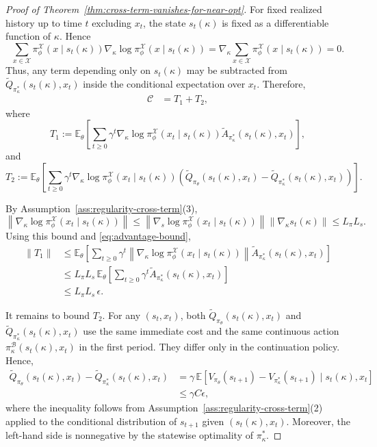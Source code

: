 \documentclass{article}
\theoremstyle{definition}
\theoremstyle{remark}
\begin{document}
\begin{proof}[Proof of Theorem~\ref{thm:cross-term-vanishes-for-near-opt}]
For fixed realized history up to time $t$ excluding $x_t$, the state
$s_t(\kappa)$ is fixed as a differentiable function of $\kappa$. Hence
\[
\sum_{x\in\mathcal X}
\pi^{\mathcal X}_\phi(x\mid s_t(\kappa))
\nabla_\kappa \log \pi^{\mathcal X}_\phi(x\mid s_t(\kappa))
=
\nabla_\kappa
\sum_{x\in\mathcal X}
\pi^{\mathcal X}_\phi(x\mid s_t(\kappa))
=0.
\]
Thus, any term depending only on $s_t(\kappa)$ may be subtracted from
$\tilde Q_{\pi^*_\kappa}(s_t(\kappa),x_t)$ inside the conditional expectation over $x_t$.
Therefore,
\begin{align*}
\mathcal C
&=
T_1+T_2,
\end{align*}
where
\[
T_1
:=
\mathbb{E}_{\theta}\!\left[
\sum_{t\geq 0}\gamma^t
\nabla_{\kappa}\log \pi^{\mathcal X}_{\phi}
\!\left(x_t\mid s_t(\kappa)\right)
\tilde A_{\pi^*_\kappa}(s_t(\kappa),x_t)
\right],
\]
and
\[
T_2
:=
\mathbb{E}_{\theta}\!\left[
\sum_{t\geq 0}\gamma^t
\nabla_{\kappa}\log \pi^{\mathcal X}_{\phi}
\!\left(x_t\mid s_t(\kappa)\right)
\left(
\tilde Q_{\pi_\theta}(s_t(\kappa),x_t)
-
\tilde Q_{\pi^*_\kappa}(s_t(\kappa),x_t)
\right)
\right].
\]

By Assumption~\ref{ass:regularity-cross-term}(3),
\[
\left\|
\nabla_{\kappa}\log \pi^{\mathcal X}_{\phi}
(x_t\mid s_t(\kappa))
\right\|
\leq
\left\|
\nabla_s \log \pi^{\mathcal X}_{\phi}
(x_t\mid s_t(\kappa))
\right\|
\left\|
\nabla_\kappa s_t(\kappa)
\right\|
\leq
L_\pi L_s.
\]
Using this bound and \eqref{eq:advantage-bound},
\begin{align*}
\|T_1\|
&\leq
\mathbb{E}_{\theta}\!\left[
\sum_{t\geq 0}\gamma^t
\left\|
\nabla_{\kappa}\log \pi^{\mathcal X}_{\phi}
(x_t\mid s_t(\kappa))
\right\|
\tilde A_{\pi^*_\kappa}(s_t(\kappa),x_t)
\right] \\
&\leq
L_\pi L_s\,
\mathbb{E}_{\theta}\!\left[
\sum_{t\geq 0}\gamma^t
\tilde A_{\pi^*_\kappa}(s_t(\kappa),x_t)
\right] \\
&\leq
L_\pi L_s\,\epsilon.
\end{align*}

It remains to bound $T_2$. For any $(s_t,x_t)$, both
$\tilde Q_{\pi_\theta}(s_t(\kappa),x_t)$ and $\tilde Q_{\pi^*_\kappa}(s_t(\kappa),x_t)$ use the
same immediate cost and the same continuous action
$\pi^{\mathcal B}_{\kappa}(s_t(\kappa),x_t)$ in the first period. They differ
only in the continuation policy. Hence,
\begin{align}
\label{eq:q-difference-bound}
\tilde Q_{\pi_\theta}(s_t(\kappa),x_t)
-
\tilde Q_{\pi^*_\kappa}(s_t(\kappa),x_t)
&=
\gamma\,
\mathbb{E}\!\left[
V_{\pi_\theta}(s_{t+1})
-
V_{\pi^*_\kappa}(s_{t+1})
\mid s_t(\kappa),x_t
\right] \\
&\leq
\gamma C\epsilon,
\nonumber
\end{align}
where the inequality follows from Assumption~\ref{ass:regularity-cross-term}(2)
applied to the conditional distribution of $s_{t+1}$ given $(s_t(\kappa),x_t)$.
Moreover, the left-hand side is nonnegative by the statewise optimality of
$\pi^*_\kappa$.


\end{proof}
\end{document}

